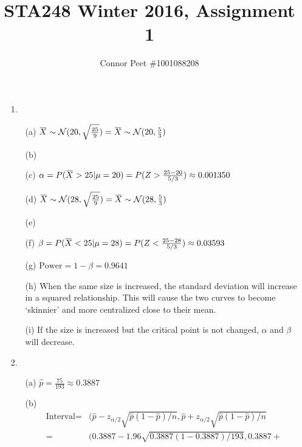 \documentclass{article}
\title{STA248 Winter 2016, Assignment 1}
\author{Connor Peet \#1001088208}
\begin{document}
\maketitle

\lstset{
    numbers=left
}

\newcommand{\overbar}[1]{\mkern 1.5mu\overline{\mkern-1.5mu#1\mkern-1.5mu}\mkern 1.5mu}

\begin{enumerate}
\item [1.]
    \begin{enumerate}
    \item [(a)] $\overbar{X} \sim \mathcal{N}(20, \sqrt{\frac{25}{9}}) = \overbar{X} \sim \mathcal{N}(20, \frac{5}{3})$
    \item [(b)] \vspace{3cm}
    \item [(c)] $\alpha = P(\overbar{X} > 25 | \mu = 20) = P(Z > \frac{25 - 20}{5 / 3}) \approx 0.001350$
    \item [(d)] $\overbar{X} \sim \mathcal{N}(28, \sqrt{\frac{25}{9}}) = \overbar{X} \sim \mathcal{N}(28, \frac{5}{3})$
    \item [(e)] \vspace{3cm}
    \item [(f)] $\beta = P(\overbar{X} < 25 | \mu = 28) = P(Z < \frac{25 - 28}{5 / 3}) \approx 0.03593$
    \item [(g)] $\text{Power} = 1 - \beta = 0.9641$
    \item [(h)] When the same size is increased, the standard deviation will increase in a squared relationship. This will cause the two curves to become `skinnier' and more centralized close to their mean.
    \item [(i)] If the size is increased but the critical point is not changed, $\alpha$ and $\beta$ will decrease.
    \end{enumerate}
\item [2.]
    \begin{enumerate}
    \item [(a)] $\hat{p} = \frac{75}{193} \approx 0.3887 $
    \item [(b)]
        \begin{equation*}
        \begin{aligned}
        \text{Interval} =& (\hat{p} - z_{\alpha / 2} \sqrt{\hat{p} (1 - \hat{p}) / n}, \hat{p} + z_{\alpha / 2} \sqrt{\hat{p} (1 - \hat{p}) / n} \\
            =& (0.3887 - 1.96 \sqrt{0.3887 (1 - 0.3887) / 193}, 0.3887 + \\

\end{aligned}
\end{equation*}
\end{enumerate}
\end{enumerate}
\end{document}
